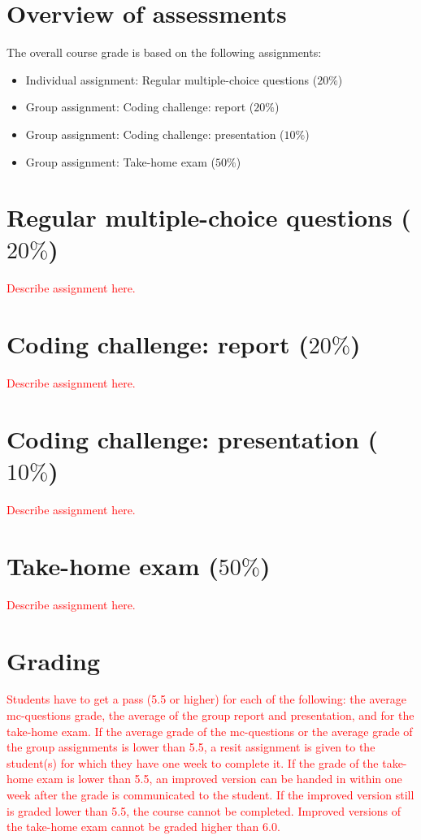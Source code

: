 \documentclass[a4paper,10pt]{report}
\begin{document}
	\section{Overview of assessments}
	The overall course grade is based on the following assignments:
	\begin{itemize}
		\item Individual assignment: Regular multiple-choice questions (\(20\%\))
		\item Group assignment: Coding challenge: report (\(20\%\))
		\item Group assignment: Coding challenge: presentation (\(10\%\))
		\item Group assignment: Take-home exam (\(50\%\))
	\end{itemize}

	
	\section{Regular multiple-choice questions ($20\%$)}
	\textcolor{red}{Describe assignment here.}
	
	\section{Coding challenge: report ($20\%$)}
	\textcolor{red}{Describe assignment here.}
	
	\section{Coding challenge: presentation ($10\%$)}
	\textcolor{red}{Describe assignment here.}
	
	\section{Take-home exam ($50\%$)}
	\textcolor{red}{Describe assignment here.}

	\section{Grading}
	\textcolor{red}{Students have to get a pass (5.5 or higher) for each of the following: the average mc-questions grade, the average of the group report and presentation, and for the take-home exam. If the average grade of the mc-questions or the average grade of the group assignments is lower than 5.5, a resit assignment is given to the student(s) for which they have one week to complete it. If the grade of the take-home exam is lower than 5.5, an improved version can be handed in within one week after the grade is communicated to the student. If the improved version still is graded lower than 5.5, the course cannot be completed. Improved versions of the take-home exam cannot be graded higher than 6.0.} 
	
\end{document}
